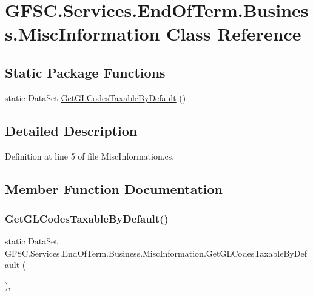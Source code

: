 \hypertarget{class_g_f_s_c_1_1_services_1_1_end_of_term_1_1_business_1_1_misc_information}{}\section{G\+F\+S\+C.\+Services.\+End\+Of\+Term.\+Business.\+Misc\+Information Class Reference}
\label{class_g_f_s_c_1_1_services_1_1_end_of_term_1_1_business_1_1_misc_information}
\subsection*{Static Package Functions}
\begin{DoxyCompactItemize}
\item 
static Data\+Set \mbox{\hyperlink{class_g_f_s_c_1_1_services_1_1_end_of_term_1_1_business_1_1_misc_information_a305d532d562ee59a9109c9097599addc}{Get\+G\+L\+Codes\+Taxable\+By\+Default}} ()
\end{DoxyCompactItemize}


\subsection{Detailed Description}


Definition at line 5 of file Misc\+Information.\+cs.



\subsection{Member Function Documentation}
\mbox{\label{class_g_f_s_c_1_1_services_1_1_end_of_term_1_1_business_1_1_misc_information_a305d532d562ee59a9109c9097599addc}} 
\subsubsection{\texorpdfstring{Get\+G\+L\+Codes\+Taxable\+By\+Default()}{GetGLCodesTaxableByDefault()}}
{\footnotesize\ttfamily static Data\+Set G\+F\+S\+C.\+Services.\+End\+Of\+Term.\+Business.\+Misc\+Information.\+Get\+G\+L\+Codes\+Taxable\+By\+Default (\begin{DoxyParamCaption}{ }\end{DoxyParamCaption})\hspace{0.3cm}{\ttfamily [static]}, {\ttfamily [package]}}



